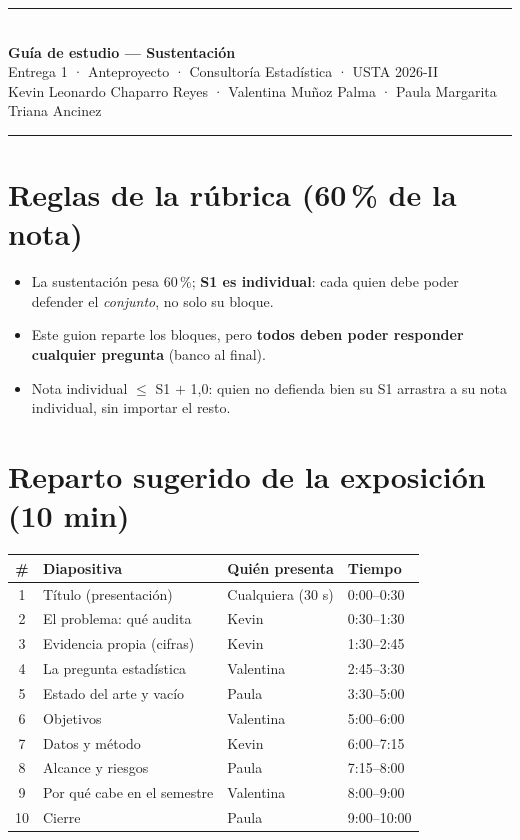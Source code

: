 \documentclass[11pt,a4paper]{article}
\begin{document}
\begin{center}
{\color{usta}\rule{\linewidth}{1.2pt}}\\[0.4cm]
{\LARGE\bfseries Guía de estudio — Sustentación}\\[0.15cm]
{\large Entrega 1 · Anteproyecto · Consultoría Estadística · USTA 2026-II}\\[0.25cm]
{\normalsize Kevin Leonardo Chaparro Reyes · Valentina Muñoz Palma · Paula Margarita Triana Ancinez}\\[0.3cm]
{\color{usta}\rule{\linewidth}{1.2pt}}
\end{center}

\section*{Reglas de la rúbrica (60\,\% de la nota)}
\begin{itemize}
  \item La sustentación pesa 60\,\%; \textbf{S1 es individual}: cada quien debe
        poder defender el \emph{conjunto}, no solo su bloque.
  \item Este guion reparte los bloques, pero \textbf{todos deben poder responder
        cualquier pregunta} (banco al final).
  \item Nota individual $\le$ S1 $+$ 1{,}0: quien no defienda bien su S1 arrastra
        a su nota individual, sin importar el resto.
\end{itemize}

\section*{Reparto sugerido de la exposición (10 min)}
\begin{center}
\small
\begin{tabularx}{\linewidth}{@{}c l l X@{}}
\toprule
\textbf{\#} & \textbf{Diapositiva} & \textbf{Quién presenta} & \textbf{Tiempo} \\
\midrule
1 & Título (presentación) & Cualquiera (30 s) & 0:00--0:30 \\
2 & El problema: qué audita & Kevin & 0:30--1:30 \\
3 & Evidencia propia (cifras) & Kevin & 1:30--2:45 \\
4 & La pregunta estadística & Valentina & 2:45--3:30 \\
5 & Estado del arte y vacío & Paula & 3:30--5:00 \\
6 & Objetivos & Valentina & 5:00--6:00 \\
7 & Datos y método & Kevin & 6:00--7:15 \\
8 & Alcance y riesgos & Paula & 7:15--8:00 \\
9 & Por qué cabe en el semestre & Valentina & 8:00--9:00 \\
10 & Cierre & Paula & 9:00--10:00 \\
\bottomrule
\end{tabularx}
\end{center}
\end{document}
